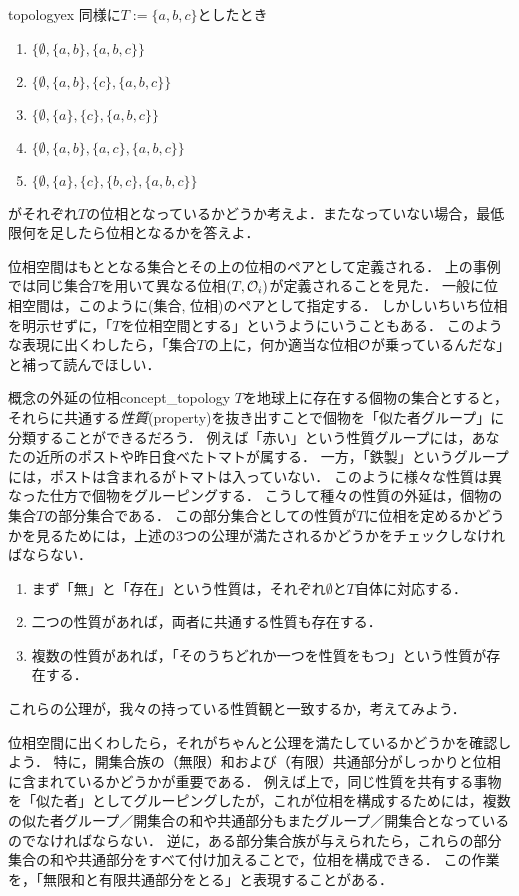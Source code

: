 \documentclass[11pt,a4paper, dvipdfmx]{jsarticle}
\begin{document}
\begin{renshu}{}{topologyex}
同様に$T:=\{a, b, c\}$としたとき
\begin{enumerate}
\item $\{ \emptyset, \{a,b\}, \{a,b,c\} \}$
\item $\{ \emptyset, \{a,b\}, \{c\}, \{a,b,c\} \}$
\item $\{ \emptyset, \{a\}, \{c\}, \{a,b,c\} \}$
\item $\{ \emptyset, \{a,b\}, \{a,c\}, \{a,b,c\} \}$
\item $\{ \emptyset, \{a\}, \{c\}, \{b, c\}, \{a,b,c\} \}$
\end{enumerate}
がそれぞれ$T$の位相となっているかどうか考えよ．またなっていない場合，最低限何を足したら位相となるかを答えよ．
\end{renshu}

位相空間はもととなる集合とその上の位相のペアとして定義される．
上の事例では同じ集合$T$を用いて異なる位相$(T, \mathcal{O}_i)$が定義されることを見た．
一般に位相空間は，このように(集合, 位相)のペアとして指定する．
しかしいちいち位相を明示せずに，「$T$を位相空間とする」というようにいうこともある．
このような表現に出くわしたら，「集合$T$の上に，何か適当な位相$\mathcal{O}$が乗っているんだな」と補って読んでほしい．


\begin{rei}{概念の外延の位相}{concept_topology}
$T$を地球上に存在する個物の集合とすると，それらに共通する\emph{性質}(property)を抜き出すことで個物を「似た者グループ」に分類することができるだろう．
例えば「赤い」という性質グループには，あなたの近所のポストや昨日食べたトマトが属する．
一方，「鉄製」というグループには，ポストは含まれるがトマトは入っていない．
このように様々な性質は異なった仕方で個物をグルーピングする．
こうして種々の性質の外延は，個物の集合$T$の部分集合である．
この部分集合としての性質が$T$に位相を定めるかどうかを見るためには，上述の3つの公理が満たされるかどうかをチェックしなければならない．
\begin{enumerate}
 \item まず「無」と「存在」という性質は，それぞれ$\emptyset$と$T$自体に対応する．
 \item 二つの性質があれば，両者に共通する性質も存在する．
 \item 複数の性質があれば，「そのうちどれか一つを性質をもつ」という性質が存在する．
\end{enumerate}
これらの公理が，我々の持っている性質観と一致するか，考えてみよう．
\end{rei}


位相空間に出くわしたら，それがちゃんと公理を満たしているかどうかを確認しよう．
特に，開集合族の（無限）和および（有限）共通部分がしっかりと位相に含まれているかどうかが重要である．
例えば上で，同じ性質を共有する事物を「似た者」としてグルーピングしたが，これが位相を構成するためには，複数の似た者グループ／開集合の和や共通部分もまたグループ／開集合となっているのでなければならない．
逆に，ある部分集合族が与えられたら，これらの部分集合の和や共通部分をすべて付け加えることで，位相を構成できる．
この作業を，「無限和と有限共通部分をとる」と表現することがある．
\end{document}
